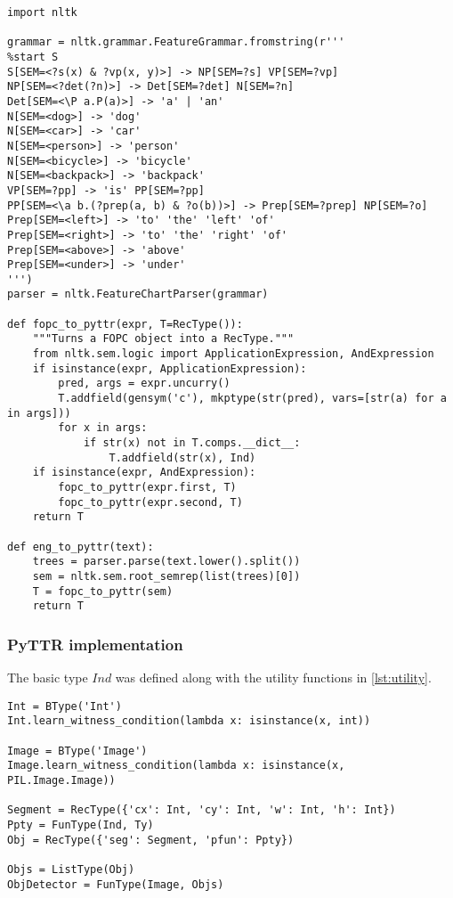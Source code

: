 \begin{lstlisting}[label=lst:grammar, caption=Basic parsing of natural language into PyTTR object.]
import nltk

grammar = nltk.grammar.FeatureGrammar.fromstring(r'''
%start S
S[SEM=<?s(x) & ?vp(x, y)>] -> NP[SEM=?s] VP[SEM=?vp]
NP[SEM=<?det(?n)>] -> Det[SEM=?det] N[SEM=?n]
Det[SEM=<\P a.P(a)>] -> 'a' | 'an'
N[SEM=<dog>] -> 'dog'
N[SEM=<car>] -> 'car'
N[SEM=<person>] -> 'person'
N[SEM=<bicycle>] -> 'bicycle'
N[SEM=<backpack>] -> 'backpack'
VP[SEM=?pp] -> 'is' PP[SEM=?pp]
PP[SEM=<\a b.(?prep(a, b) & ?o(b))>] -> Prep[SEM=?prep] NP[SEM=?o]
Prep[SEM=<left>] -> 'to' 'the' 'left' 'of'
Prep[SEM=<right>] -> 'to' 'the' 'right' 'of'
Prep[SEM=<above>] -> 'above'
Prep[SEM=<under>] -> 'under'
''')
parser = nltk.FeatureChartParser(grammar)

def fopc_to_pyttr(expr, T=RecType()):
    """Turns a FOPC object into a RecType."""
    from nltk.sem.logic import ApplicationExpression, AndExpression
    if isinstance(expr, ApplicationExpression):
        pred, args = expr.uncurry()
        T.addfield(gensym('c'), mkptype(str(pred), vars=[str(a) for a in args]))
        for x in args:
            if str(x) not in T.comps.__dict__:
                T.addfield(str(x), Ind)
    if isinstance(expr, AndExpression):
        fopc_to_pyttr(expr.first, T)
        fopc_to_pyttr(expr.second, T)
    return T

def eng_to_pyttr(text):
    trees = parser.parse(text.lower().split())
    sem = nltk.sem.root_semrep(list(trees)[0])
    T = fopc_to_pyttr(sem)
    return T
\end{lstlisting}



\subsubsection{PyTTR implementation}

The basic type $Ind$ was defined along with the utility functions in \autoref{lst:utility}.

\begin{lstlisting}[label={lst:pyttrbasic}]
Int = BType('Int')
Int.learn_witness_condition(lambda x: isinstance(x, int))

Image = BType('Image')
Image.learn_witness_condition(lambda x: isinstance(x, PIL.Image.Image))

Segment = RecType({'cx': Int, 'cy': Int, 'w': Int, 'h': Int})
Ppty = FunType(Ind, Ty)
Obj = RecType({'seg': Segment, 'pfun': Ppty})

Objs = ListType(Obj)
ObjDetector = FunType(Image, Objs)
\end{lstlisting}


